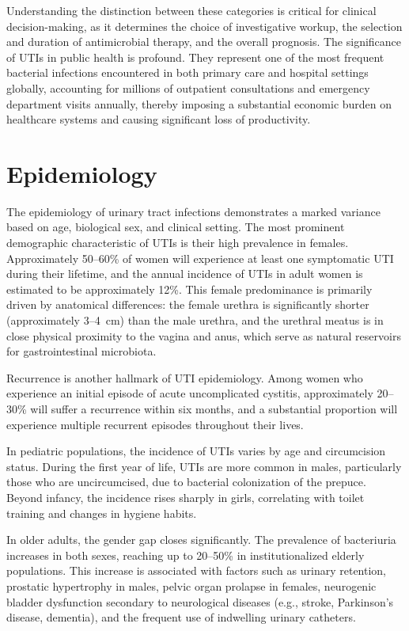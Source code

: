 Understanding the distinction between these categories is critical for clinical decision-making, as it determines the choice of investigative workup, the selection and duration of antimicrobial therapy, and the overall prognosis. The significance of UTIs in public health is profound. They represent one of the most frequent bacterial infections encountered in both primary care and hospital settings globally, accounting for millions of outpatient consultations and emergency department visits annually, thereby imposing a substantial economic burden on healthcare systems and causing significant loss of productivity.

\section*{Epidemiology}
The epidemiology of urinary tract infections demonstrates a marked variance based on age, biological sex, and clinical setting. The most prominent demographic characteristic of UTIs is their high prevalence in females. Approximately 50--60\% of women will experience at least one symptomatic UTI during their lifetime, and the annual incidence of UTIs in adult women is estimated to be approximately 12\%. This female predominance is primarily driven by anatomical differences: the female urethra is significantly shorter (approximately 3--4~cm) than the male urethra, and the urethral meatus is in close physical proximity to the vagina and anus, which serve as natural reservoirs for gastrointestinal microbiota.

Recurrence is another hallmark of UTI epidemiology. Among women who experience an initial episode of acute uncomplicated cystitis, approximately 20--30\% will suffer a recurrence within six months, and a substantial proportion will experience multiple recurrent episodes throughout their lives.

In pediatric populations, the incidence of UTIs varies by age and circumcision status. During the first year of life, UTIs are more common in males, particularly those who are uncircumcised, due to bacterial colonization of the prepuce. Beyond infancy, the incidence rises sharply in girls, correlating with toilet training and changes in hygiene habits.

In older adults, the gender gap closes significantly. The prevalence of bacteriuria increases in both sexes, reaching up to 20--50\% in institutionalized elderly populations. This increase is associated with factors such as urinary retention, prostatic hypertrophy in males, pelvic organ prolapse in females, neurogenic bladder dysfunction secondary to neurological diseases (e.g., stroke, Parkinson's disease, dementia), and the frequent use of indwelling urinary catheters.

